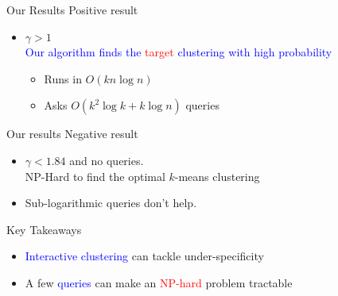 \documentclass{beamer}
\begin{document}
\begin{frame}{Our Results}
  \alert{Positive result}
  \vspace{0.5cm}
  \begin{itemize}
    
    \item $\gamma > 1$ \\
    \vspace{0.3cm} \textcolor{blue}{Our algorithm finds the} \textcolor{red}{target} \textcolor{blue}{clustering with high probability}
    
    \begin{itemize}
    	\vspace{0.3cm}
        \item Runs in $O(kn\log n)$
        \vspace{0.3cm}
        \item Asks $O(k^2\log k + k\log n)$ queries
    \end{itemize}
   \end{itemize}
\end{frame}

\begin{frame}{Our results}
	\alert{Negative result} 
	\vspace{0.5cm}
    \begin{itemize}
    \item $\gamma < 1.84$ and no queries.\\
    \vspace{0.3cm} {NP-Hard to find the optimal $k$-means clustering}
    \vspace{0.5cm}
    \item Sub-logarithmic queries don't help.
  \end{itemize}
\end{frame}

\begin{frame}{Key Takeaways}
\begin{itemize}
	\item \textcolor{blue}{Interactive clustering} can tackle \alert{under-specificity} \\
	\vspace{1.0cm}
	\item A few \textcolor{blue}{queries} can make an \textcolor{red}{NP-hard} problem tractable
\end{itemize}
\end{frame}
\end{document}
